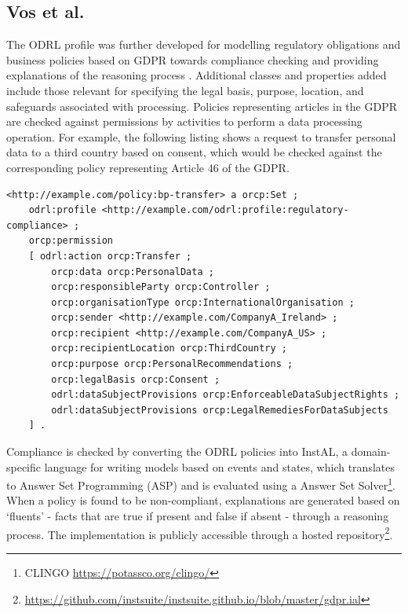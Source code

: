 \subsection*{Vos et al.}
The ODRL profile was further developed for modelling regulatory obligations and business policies based on GDPR towards compliance checking and providing explanations of the reasoning process \cite{vos_odrl_2019}. Additional classes and properties added include those relevant for specifying the legal basis, purpose, location, and safeguards associated with processing. Policies representing articles in the GDPR are checked against permissions by activities to perform a data processing operation. For example, the following listing shows a request to transfer personal data to a third country based on consent, which would be checked against the corresponding policy representing Article 46 of the GDPR. 
\begin{listing}[htbp]
\begin{verbatim}
<http://example.com/policy:bp-transfer> a orcp:Set ;
    odrl:profile <http://example.com/odrl:profile:regulatory-compliance> ;
    orcp:permission
    [ odrl:action orcp:Transfer ;
        orcp:data orcp:PersonalData ;
        orcp:responsibleParty orcp:Controller ;
        orcp:organisationType orcp:InternationalOrganisation ;
        orcp:sender <http://example.com/CompanyA_Ireland> ;
        orcp:recipient <http://example.com/CompanyA_US> ;
        orcp:recipientLocation orcp:ThirdCountry ;
        orcp:purpose orcp:PersonalRecommendations ;
        orcp:legalBasis orcp:Consent ;
        odrl:dataSubjectProvisions orcp:EnforceableDataSubjectRights ;
        odrl:dataSubjectProvisions orcp:LegalRemediesForDataSubjects
    ] .
\end{verbatim}
\end{listing}
Compliance is checked by converting the ODRL policies into InstAL, a domain-specific language for writing models based on events and states, which translates to Answer Set Programming (ASP) and is evaluated using a Answer Set Solver\footnote{CLINGO \url{https://potassco.org/clingo/}}. When a policy is found to be non-compliant, explanations are generated based on `fluents' - facts that are true if present and false if absent - through a reasoning process. The implementation is publicly accessible through a hosted repository\footnote{\url{https://github.com/instsuite/instsuite.github.io/blob/master/gdpr.ial}}. 

